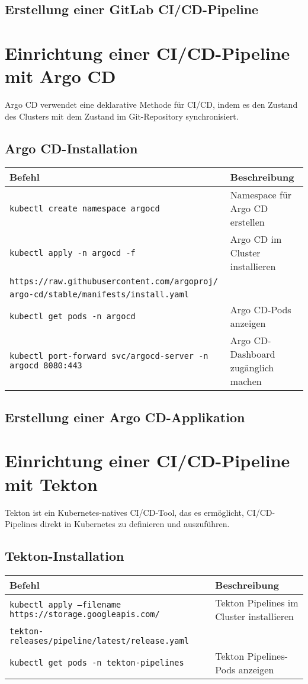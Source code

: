 \subsection{Erstellung einer GitLab CI/CD-Pipeline}
\noindent


\section{Einrichtung einer CI/CD-Pipeline mit Argo CD}
Argo CD verwendet eine deklarative Methode für CI/CD, indem es den Zustand des Clusters mit dem Zustand im Git-Repository synchronisiert.

\subsection{Argo CD-Installation}
\noindent
\begin{tabular}{|p{}|p{}|}
\hline
\textbf{Befehl} & \textbf{Beschreibung} \\
\hline
\texttt{kubectl create namespace argocd} & Namespace für Argo CD erstellen \\
\texttt{kubectl apply -n argocd -f} & Argo CD im Cluster installieren \\
\texttt{https://raw.githubusercontent.com/argoproj/}& \\
\texttt{argo-cd/stable/manifests/install.yaml}& \\
\texttt{kubectl get pods -n argocd} & Argo CD-Pods anzeigen \\
\texttt{kubectl port-forward svc/argocd-server -n argocd 8080:443} & Argo CD-Dashboard zugänglich machen \\
\hline
\end{tabular}
\newpage
\subsection{Erstellung einer Argo CD-Applikation}


\section{Einrichtung einer CI/CD-Pipeline mit Tekton}
Tekton ist ein Kubernetes-natives CI/CD-Tool, das es ermöglicht, CI/CD-Pipelines direkt in Kubernetes zu definieren und auszuführen.

\subsection{Tekton-Installation}
\noindent
\begin{tabular}{|p{}|p{}|}
\hline
\textbf{Befehl} & \textbf{Beschreibung} \\
\hline
\texttt{kubectl apply --filename https://storage.googleapis.com/} & Tekton Pipelines im Cluster installieren \\
\texttt{tekton-releases/pipeline/latest/release.yaml} & \\
\texttt{kubectl get pods -n tekton-pipelines} & Tekton Pipelines-Pods anzeigen \\
\hline
\end{tabular}

